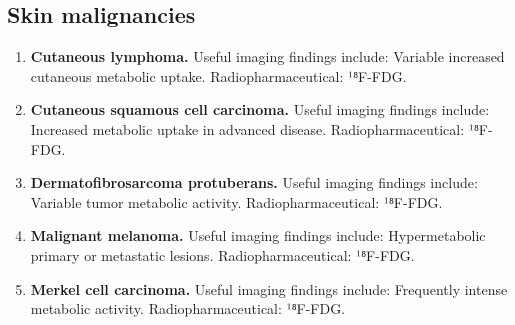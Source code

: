 \subsection{Skin malignancies}
\begin{enumerate}[leftmargin=*,itemsep=0.45em,topsep=0.4em]
\item \textbf{Cutaneous lymphoma.} Useful imaging findings include: Variable increased cutaneous metabolic uptake. Radiopharmaceutical: ¹⁸F-FDG.
\item \textbf{Cutaneous squamous cell carcinoma.} Useful imaging findings include: Increased metabolic uptake in advanced disease. Radiopharmaceutical: ¹⁸F-FDG.
\item \textbf{Dermatofibrosarcoma protuberans.} Useful imaging findings include: Variable tumor metabolic activity. Radiopharmaceutical: ¹⁸F-FDG.
\item \textbf{Malignant melanoma.} Useful imaging findings include: Hypermetabolic primary or metastatic lesions. Radiopharmaceutical: ¹⁸F-FDG.
\item \textbf{Merkel cell carcinoma.} Useful imaging findings include: Frequently intense metabolic activity. Radiopharmaceutical: ¹⁸F-FDG.
\end{enumerate}

